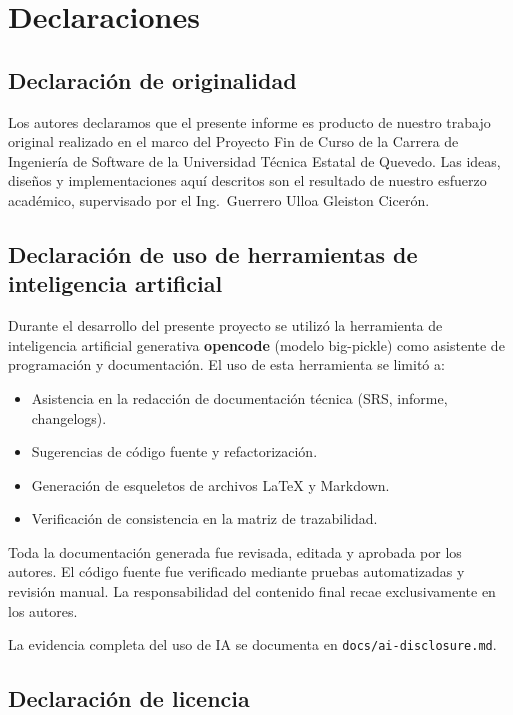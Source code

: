 \chapter*{Declaraciones}

\section*{Declaración de originalidad}

Los autores declaramos que el presente informe es producto de nuestro trabajo original realizado en el marco del Proyecto Fin de Curso de la Carrera de Ingeniería de Software de la Universidad Técnica Estatal de Quevedo. Las ideas, diseños y implementaciones aquí descritos son el resultado de nuestro esfuerzo académico, supervisado por el Ing.~Guerrero Ulloa Gleiston Cicerón.

\section*{Declaración de uso de herramientas de inteligencia artificial}

Durante el desarrollo del presente proyecto se utilizó la herramienta de inteligencia artificial generativa \textbf{opencode} (modelo big-pickle) como asistente de programación y documentación. El uso de esta herramienta se limitó a:
\begin{itemize}
  \item Asistencia en la redacción de documentación técnica (SRS, informe, changelogs).
  \item Sugerencias de código fuente y refactorización.
  \item Generación de esqueletos de archivos LaTeX y Markdown.
  \item Verificación de consistencia en la matriz de trazabilidad.
\end{itemize}

Toda la documentación generada fue revisada, editada y aprobada por los autores. El código fuente fue verificado mediante pruebas automatizadas y revisión manual. La responsabilidad del contenido final recae exclusivamente en los autores.

La evidencia completa del uso de IA se documenta en \texttt{docs/ai-disclosure.md}.

\section*{Declaración de licencia}

